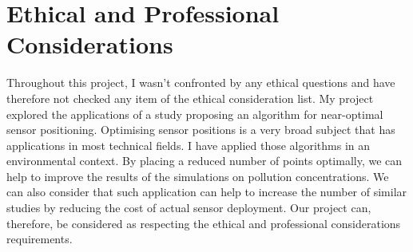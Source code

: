 \chapter{Ethical and Professional Considerations}


Throughout this project, I wasn't confronted by any ethical questions and have therefore not checked any item of the ethical consideration list. My project explored the applications of a study proposing an algorithm for near-optimal sensor positioning. Optimising sensor positions is a very broad subject that has applications in most technical fields. I have applied those algorithms in an environmental context. By placing a reduced number of points optimally, we can help to improve the results of the simulations on pollution concentrations. We can also consider that such application can help to increase the number of similar studies by reducing the cost of actual sensor deployment. Our project can, therefore, be considered as respecting the ethical and professional considerations requirements. 

  
